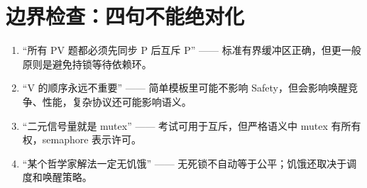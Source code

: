 \documentclass[11pt,a4paper]{ctexart}
\begin{document}
\section*{边界检查：四句不能绝对化}

\begin{warn}[四句不应绝对化的话]
\begin{enumerate}
\item “所有 PV 题都必须先同步 P 后互斥 P” —— 标准有界缓冲区正确，但更一般原则是避免持锁等待依赖环。
\item “V 的顺序永远不重要” —— 简单模板里可能不影响 Safety，但会影响唤醒竞争、性能，复杂协议还可能影响语义。
\item “二元信号量就是 mutex” —— 考试可用于互斥，但严格语义中 mutex 有所有权，semaphore 表示许可。
\item “某个哲学家解法一定无饥饿” —— 无死锁不自动等于公平；饥饿还取决于调度和唤醒策略。
\end{enumerate}
\end{warn}
\end{document}
